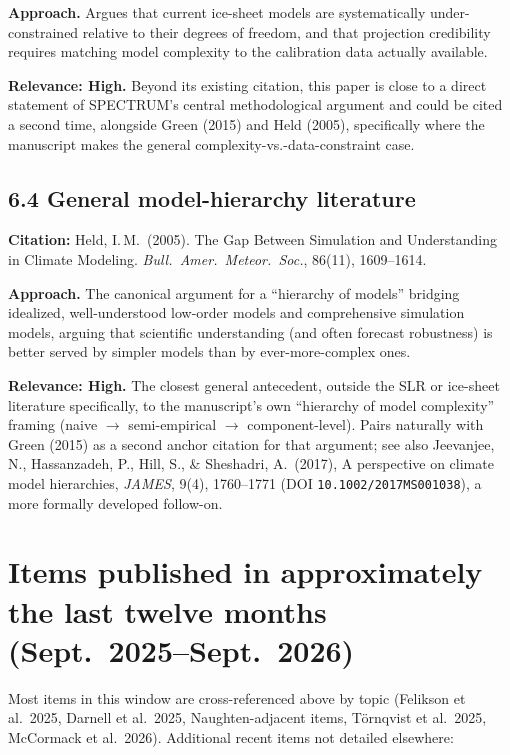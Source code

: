 \documentclass[11pt]{article}
\begin{document}
\noindent\textbf{Approach.} Argues that current ice-sheet models are
systematically under-constrained relative to their degrees of freedom, and
that projection credibility requires matching model complexity to the
calibration data actually available.

\noindent\textbf{Relevance: High.} Beyond its existing citation, this paper
is close to a direct statement of SPECTRUM's central methodological
argument and could be cited a second time, alongside Green (2015) and Held
(2005), specifically where the manuscript makes the general
complexity-vs.-data-constraint case.

\subsection*{6.4 General model-hierarchy literature}

\noindent\textbf{Citation:} Held, I.\,M.\ (2005). The Gap Between Simulation
and Understanding in Climate Modeling. \textit{Bull.\ Amer.\ Meteor.\
Soc.}, 86(11), 1609--1614.

\noindent\textbf{Approach.} The canonical argument for a ``hierarchy of
models'' bridging idealized, well-understood low-order models and
comprehensive simulation models, arguing that scientific understanding (and
often forecast robustness) is better served by simpler models than by
ever-more-complex ones.

\noindent\textbf{Relevance: High.} The closest general antecedent, outside
the SLR or ice-sheet literature specifically, to the manuscript's own
``hierarchy of model complexity'' framing (naive $\rightarrow$ semi-empirical
$\rightarrow$ component-level). Pairs naturally with Green (2015) as a
second anchor citation for that argument; see also Jeevanjee, N.,
Hassanzadeh, P., Hill, S., \& Sheshadri, A.\ (2017), A perspective on
climate model hierarchies, \textit{JAMES}, 9(4), 1760--1771 (DOI
\texttt{10.1002/2017MS001038}), a more formally developed follow-on.

\section{Items published in approximately the last twelve months (Sept.\ 2025--Sept.\ 2026)}

Most items in this window are cross-referenced above by topic (Felikson et
al.\ 2025, Darnell et al.\ 2025, Naughten-adjacent items, Törnqvist et al.\
2025, McCormack et al.\ 2026). Additional recent items not detailed
elsewhere:
\end{document}

